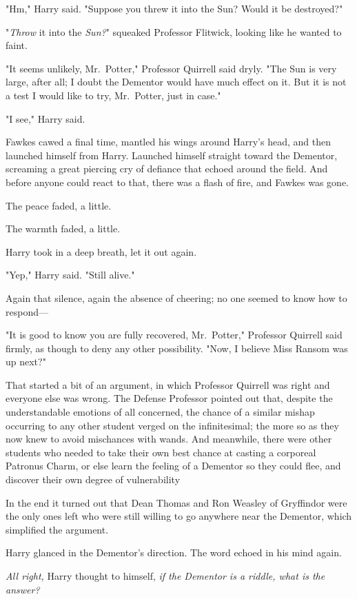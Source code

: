 "Hm," Harry said. "Suppose you threw it into the Sun? Would it be destroyed?"

"\emph{Throw} it into the \emph{Sun?}" squeaked Professor Flitwick, looking
like he wanted to faint.

"It seems unlikely, Mr.~Potter," Professor Quirrell said dryly. "The Sun is
very large, after all; I doubt the Dementor would have much effect on it. But
it is not a test I would like to try, Mr.~Potter, just in case."

"I see," Harry said.

Fawkes cawed a final time, mantled his wings around Harry's head, and then
launched himself from Harry. Launched himself straight toward the Dementor,
screaming a great piercing cry of defiance that echoed around the field. And
before anyone could react to that, there was a flash of fire, and Fawkes was
gone.

The peace faded, a little.

The warmth faded, a little.

Harry took in a deep breath, let it out again.

"Yep," Harry said. "Still alive."

Again that silence, again the absence of cheering; no one seemed to know how to
respond---

"It is good to know you are fully recovered, Mr.~Potter," Professor Quirrell
said firmly, as though to deny any other possibility. "Now, I believe Miss
Ransom was up next?"

That started a bit of an argument, in which Professor Quirrell was right and
everyone else was wrong. The Defense Professor pointed out that, despite the
understandable emotions of all concerned, the chance of a similar mishap
occurring to any other student verged on the infinitesimal; the more so as they
now knew to avoid mischances with wands. And meanwhile, there were other
students who needed to take their own best chance at casting a corporeal
Patronus Charm, or else learn the feeling of a Dementor so they could flee, and
discover their own degree of vulnerability{\el}

In the end it turned out that Dean Thomas and Ron Weasley of Gryffindor were
the only ones left who were still willing to go anywhere near the Dementor,
which simplified the argument.

Harry glanced in the Dementor's direction. The word echoed in his mind again.

\emph{All right,} Harry thought to himself, \emph{if the Dementor is a riddle,
what is the answer?}

